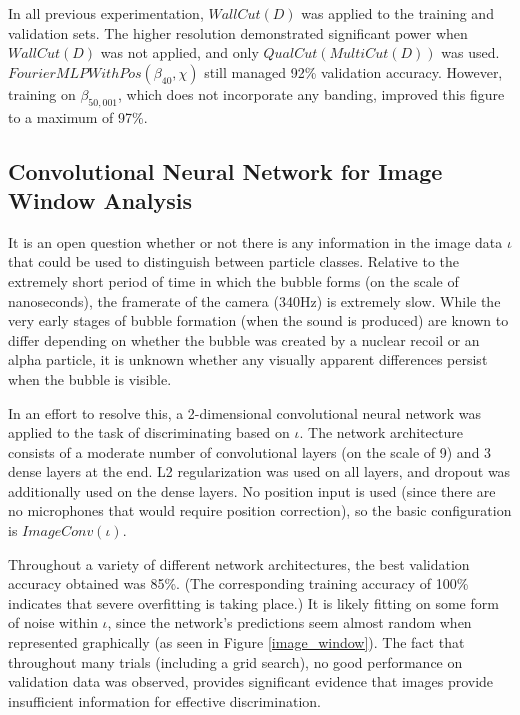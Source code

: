\documentclass[10pt]{article}
\begin{document}
In all previous experimentation, $WallCut(D)$ was applied to the training and validation sets. The higher resolution demonstrated significant power when $WallCut(D)$ was not applied, and only $QualCut(MultiCut(D))$ was used. $FourierMLPWithPos(\beta_{40}, \chi)$ still managed 92\% validation accuracy. However, training on $\beta_{50,001}$, which does not incorporate any banding, improved this figure to a maximum of 97\%.

\subsection{Convolutional Neural Network for Image Window Analysis}

It is an open question whether or not there is any information in the image data $\iota$ that could be used to distinguish between particle classes. Relative to the extremely short period of time in which the bubble forms (on the scale of nanoseconds), the framerate of the camera (340Hz) is extremely slow. While the very early stages of bubble formation (when the sound is produced) are known to differ depending on whether the bubble was created by a nuclear recoil or an alpha particle, it is unknown whether any visually apparent differences persist when the bubble is visible.

In an effort to resolve this, a 2-dimensional convolutional neural network was applied to the task of discriminating based on $\iota$. The network architecture consists of a moderate number of convolutional layers (on the scale of 9) and 3 dense layers at the end. L2 regularization was used on all layers, and dropout was additionally used on the dense layers. No position input is used (since there are no microphones that would require position correction), so the basic configuration is $ImageConv(\iota)$.

Throughout a variety of different network architectures, the best validation accuracy obtained was 85\%. (The corresponding training accuracy of 100\% indicates that severe overfitting is taking place.) It is likely fitting on some form of noise within $\iota$, since the network's predictions seem almost random when represented graphically (as seen in Figure \ref{image_window}). The fact that throughout many trials (including a grid search), no good performance on validation data was observed, provides significant evidence that images provide insufficient information for effective discrimination.
\end{document}
